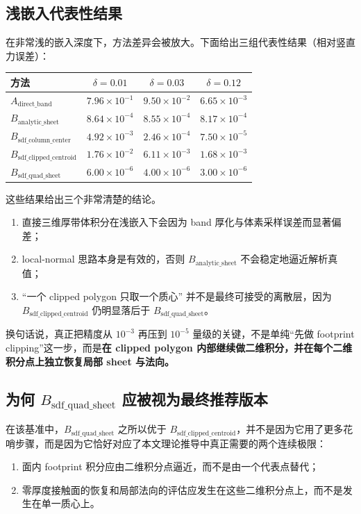 \documentclass[12pt,a4paper]{ctexart}
\begin{document}
\subsection{浅嵌入代表性结果}
在非常浅的嵌入深度下，方法差异会被放大。下面给出三组代表性结果（相对竖直力误差）：
\begin{center}
\begin{tabular}{@{}>{\raggedright\arraybackslash}p{4.6cm}ccc@{}}
\toprule
方法 & $\delta=0.01$ & $\delta=0.03$ & $\delta=0.12$ \\
\midrule
$A_{\mathrm{direct\_band}}$ & $7.96\times 10^{-1}$ & $9.50\times 10^{-2}$ & $6.65\times 10^{-3}$ \\
$B_{\mathrm{analytic\_sheet}}$ & $8.64\times 10^{-4}$ & $8.55\times 10^{-4}$ & $8.17\times 10^{-4}$ \\
$B_{\mathrm{sdf\_column\_center}}$ & $4.92\times 10^{-3}$ & $2.46\times 10^{-4}$ & $7.50\times 10^{-5}$ \\
$B_{\mathrm{sdf\_clipped\_centroid}}$ & $1.76\times 10^{-2}$ & $6.11\times 10^{-3}$ & $1.68\times 10^{-3}$ \\
$B_{\mathrm{sdf\_quad\_sheet}}$ & $6.00\times 10^{-6}$ & $4.00\times 10^{-6}$ & $3.00\times 10^{-6}$ \\
\bottomrule
\end{tabular}
\end{center}

这些结果给出三个非常清楚的结论。
\begin{enumerate}
    \item 直接三维厚带体积分在浅嵌入下会因为 band 厚化与体素采样误差而显著偏差；
    \item local-normal 思路本身是有效的，否则 $B_{\mathrm{analytic\_sheet}}$ 不会稳定地逼近解析真值；
    \item ``一个 clipped polygon 只取一个质心'' 并不是最终可接受的离散层，因为 $B_{\mathrm{sdf\_clipped\_centroid}}$ 仍明显落后于 $B_{\mathrm{sdf\_quad\_sheet}}$。
\end{enumerate}

换句话说，真正把精度从 $10^{-3}$ 再压到 $10^{-5}$ 量级的关键，不是单纯“先做 footprint clipping”这一步，而是\textbf{在 clipped polygon 内部继续做二维积分，并在每个二维积分点上独立恢复局部 sheet 与法向。}

\subsection{为何 $B_{\mathrm{sdf\_quad\_sheet}}$ 应被视为最终推荐版本}
在该基准中，$B_{\mathrm{sdf\_quad\_sheet}}$ 之所以优于 $B_{\mathrm{sdf\_clipped\_centroid}}$，并不是因为它用了更多花哨步骤，而是因为它恰好对应了本文理论推导中真正需要的两个连续极限：
\begin{enumerate}
    \item 面内 footprint 积分应由二维积分点逼近，而不是由一个代表点替代；
    \item 零厚度接触面的恢复和局部法向的评估应发生在这些二维积分点上，而不是发生在单一质心上。
\end{enumerate}
\end{document}
